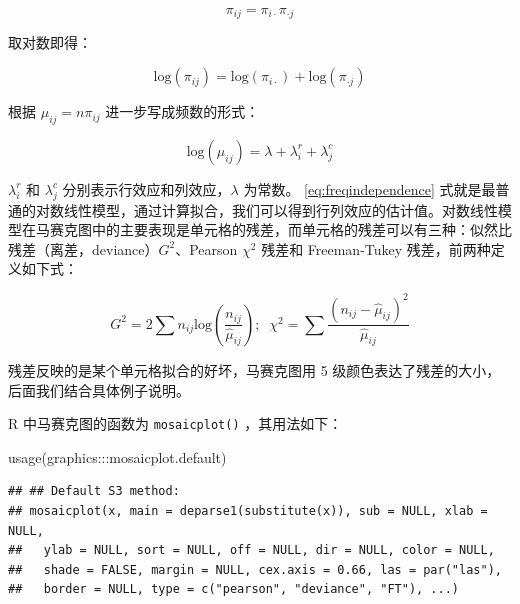 \documentclass[
  b5paper,
  UTF8,twoside]{book}
\newenvironment{Shaded}{\begin{snugshade}}{\end{snugshade}}
\newcommand{\FunctionTok}[1]{\textcolor[rgb]{0.00,0.00,0.00}{#1}}
\newcommand{\NormalTok}[1]{#1}
\newcommand{\SpecialCharTok}[1]{\textcolor[rgb]{0.00,0.00,0.00}{#1}}
\begin{document}
\begin{equation}
\pi_{ij}=\pi_{i\cdot}\pi_{\cdot j}
\label{eq:independence}
\end{equation}

取对数即得：

\begin{equation}
\mathrm{log}(\pi_{ij})=\mathrm{log}(\pi_{i\cdot})+\mathrm{log}(\pi_{\cdot j})
\label{eq:logindependence}
\end{equation}

根据 \(\mu_{ij}=n\pi_{ij}\) 进一步写成频数的形式：

\begin{equation}
\mathrm{log}(\mu_{ij})=\lambda+\lambda_{i}^{r}+\lambda_{j}^{c}
\label{eq:freqindependence}
\end{equation}

\(\lambda_{i}^{r}\) 和 \(\lambda_{j}^{c}\) 分别表示行效应和列效应，\(\lambda\) 为常数。 \eqref{eq:freqindependence} 式就是最普通的对数线性模型，通过计算拟合，我们可以得到行列效应的估计值。对数线性模型在马赛克图中的主要表现是单元格的残差，而单元格的残差可以有三种：似然比残差（离差，deviance）\(G^{2}\)、Pearson \(\chi^{2}\) 残差和 Freeman-Tukey 残差，前两种定义如下式：

\begin{equation}
G^{2}=2\sum n_{ij}\mathrm{log}(\frac{n_{ij}}{\hat{\mu}_{ij}});\;\;\chi^{2}=\sum\frac{\left(n_{ij}-\hat{\mu}_{ij}\right)^{2}}{\hat{\mu}_{ij}}
\label{eq:loglinearres}
\end{equation}

残差反映的是某个单元格拟合的好坏，马赛克图用 5 级颜色表达了残差的大小，后面我们结合具体例子说明。

R 中马赛克图的函数为 \texttt{mosaicplot()} ，其用法如下：

\begin{Shaded}
\begin{Highlighting}[]
\FunctionTok{usage}\NormalTok{(graphics}\SpecialCharTok{:::}\NormalTok{mosaicplot.default)}
\end{Highlighting}
\end{Shaded}

\begin{verbatim}
## ## Default S3 method:
## mosaicplot(x, main = deparse1(substitute(x)), sub = NULL, xlab = NULL,
##   ylab = NULL, sort = NULL, off = NULL, dir = NULL, color = NULL,
##   shade = FALSE, margin = NULL, cex.axis = 0.66, las = par("las"),
##   border = NULL, type = c("pearson", "deviance", "FT"), ...)
\end{verbatim}
\end{document}
